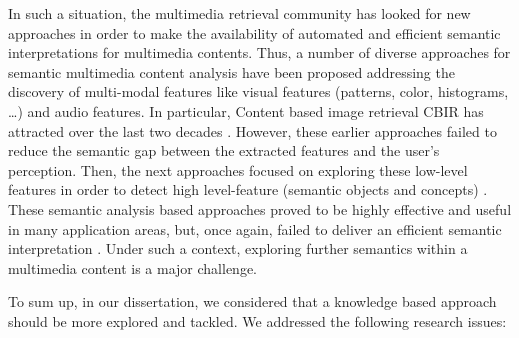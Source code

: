 	In such a situation, the multimedia retrieval community has looked for new approaches
	in order to make the availability of automated and efficient semantic interpretations for multimedia contents. 
	Thus, a number of diverse approaches for semantic multimedia content analysis have been proposed addressing 
	the discovery of multi-modal features \citep{Marques2012} like visual features (patterns, color, histograms, \dots{}) and
	audio features. In particular, Content based image retrieval 
	\gls{CBIR} has attracted  over the last two decades 
	\citep{Rui1999,Smeulders2000,Datta2005,Liu2007,Huurnink2012}. 
	However, these earlier approaches failed to reduce the semantic gap between the extracted features and the 
	user's perception. Then, the next approaches focused on exploring these low-level features in order 
	to detect high level-feature (semantic objects and concepts) \citep{Datta2008,Snoek2008,Egozi2011}. 
	These semantic analysis based approaches proved to be highly effective and useful in many application 
	areas, but, once again, failed to deliver an efficient semantic interpretation \citep{Snoek2010,Over2013}.
	Under such a context, exploring further semantics within a multimedia content is a major challenge.

	To sum up, in our dissertation, we considered that a knowledge based approach should be more explored 
	and tackled. We addressed the following research issues:

